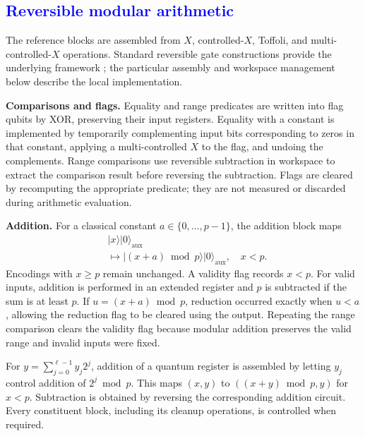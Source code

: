 \subsection{\textcolor{blue}{Reversible modular arithmetic}}
\begin{revision}
The reference blocks are assembled from $X$, controlled-$X$, Toffoli,
and multi-controlled-$X$ operations. Standard reversible gate
constructions provide the underlying framework
\cite{Barenco1995,NielsenChuang2010}; the particular assembly and
workspace management below describe the local implementation.

\textbf{Comparisons and flags.}
Equality and range predicates are written into flag qubits by XOR,
preserving their input registers. Equality with a constant is implemented
by temporarily complementing input bits corresponding to zeros in that
constant, applying a multi-controlled $X$ to the flag, and undoing the
complements. Range comparisons use reversible subtraction in workspace
to extract the comparison result before reversing the subtraction.
Flags are cleared by recomputing the appropriate predicate; they are
not measured or discarded during arithmetic evaluation.

\textbf{Addition.}
For a classical constant $a\in\{0,\ldots,p-1\}$, the addition block maps
\begin{equation}
\label{eq:app_r5_constant_addition}
\begin{aligned}
&\lvert x\rangle\lvert0\rangle_{\mathrm{aux}}\\
&\longmapsto
 \lvert(x+a)\bmod p\rangle
 \lvert0\rangle_{\mathrm{aux}},\quad x<p.
\end{aligned}
\end{equation}
Encodings with $x\geq p$ remain unchanged. A validity flag records
$x<p$. For valid inputs, addition is performed in an extended register
and $p$ is subtracted if the sum is at least $p$. If
$u=(x+a)\bmod p$, reduction occurred exactly when $u<a$, allowing the
reduction flag to be cleared using the output. Repeating the range
comparison clears the validity flag because modular addition preserves
the valid range and invalid inputs were fixed.

For $y=\sum_{j=0}^{\ell-1}y_j2^j$, addition of a quantum register is
assembled by letting $y_j$ control addition of $2^j\bmod p$. This maps
$(x,y)$ to $((x+y)\bmod p,y)$ for $x<p$. Subtraction is obtained by
reversing the corresponding addition circuit. Every constituent block,
including its cleanup operations, is controlled when required.


\end{revision}

